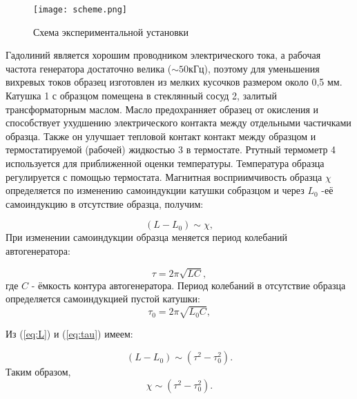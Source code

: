 \documentclass[12pt,a4paper]{article}
\begin{document}
\begin{figure}[H]
    \begin{center}
    \texttt{[image: scheme.png]}
    \caption{Схема экспериментальной установки}
    \label{scheme} %
    \end{center}
\end{figure}

Гадолиний является хорошим проводником электрического тока, а рабочая частота генератора достаточно велика ($\sim50 кГц$), поэтому для уменьшения вихревых токов образец изготовлен из мелких кусочков размером около 0,5 мм.
 Катушка 1 с образцом помещена в стеклянный сосуд 2, залитый трансформаторным маслом. Масло предохранняет образец от окисления и способствует ухудшению электрического контакта между отдельными частичками образца. Также он
  улучшает тепловой контакт контакт между образцом и термостатируемой (рабочей) жидкостью 3 в термостате. Ртутный термометр 4 используется для приближенной оценки температуры. Температура образца регулируется с помощью термостата.
\hyphenation{}
Магнитная восприимчивость образца $\chi$ определяется по изменению самоиндукции катушки собразцом и через $L_0$ -её самоиндукцию в отсутствие образца, получим:

\begin{equation}
    (L-L_0) \sim \chi, \label{eq:L}
\end{equation}
При изменении самоиндукции образца меняется период колебаний автогенератора: 

\begin{equation}
    \tau = 2\pi\sqrt{LC}, \label{eq:L}
\end{equation}
где $C$ - ёмкость контура автогенератора.
\hyphenation{} Период колебаний в отсутствие образца определяется самоиндукцией пустой катушки:
\begin{equation}
    \tau_0 = 2\pi\sqrt{L_0C}, \label{eq:tau}
\end{equation}

Из (\ref{eq:L}) и (\ref{eq:tau}) имеем:

\begin{equation}
    (L-L_0) \sim (\tau^2-\tau_0^2). \label{eq:tautau}
\end{equation}
Таким образом, 
\begin{equation}
    \chi \sim (\tau^2-\tau_0^2). \label{eq:itog}
\end{equation}
\end{document}
